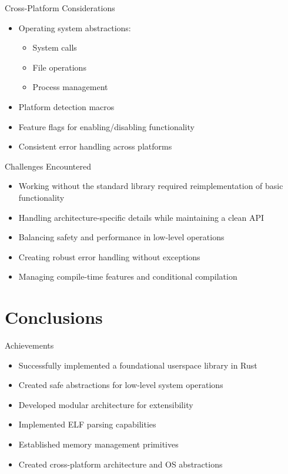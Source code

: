 \documentclass{beamer}
\begin{document}
\begin{frame}{Cross-Platform Considerations}
  \begin{itemize}
    \item Operating system abstractions:
      \begin{itemize}
        \item System calls
        \item File operations
        \item Process management
      \end{itemize}
    \item Platform detection macros
    \item Feature flags for enabling/disabling functionality
    \item Consistent error handling across platforms
  \end{itemize}
\end{frame}

\begin{frame}{Challenges Encountered}
  \begin{itemize}
    \item Working without the standard library required reimplementation of basic functionality
    \item Handling architecture-specific details while maintaining a clean API
    \item Balancing safety and performance in low-level operations
    \item Creating robust error handling without exceptions
    \item Managing compile-time features and conditional compilation
  \end{itemize}
\end{frame}

\section{Conclusions}

\begin{frame}{Achievements}
  \begin{itemize}
    \item Successfully implemented a foundational userspace library in Rust
    \item Created safe abstractions for low-level system operations
    \item Developed modular architecture for extensibility
    \item Implemented ELF parsing capabilities
    \item Established memory management primitives
    \item Created cross-platform architecture and OS abstractions
  \end{itemize}
\end{frame}
\end{document}
